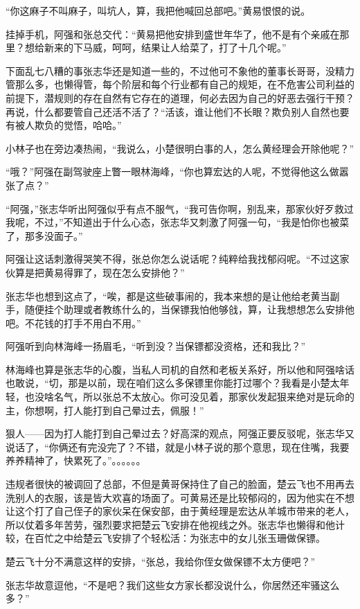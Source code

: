 “你这麻子不叫麻子，叫坑人，算，我把他喊回总部吧。”黄易恨恨的说。

挂掉手机，阿强和张总交代：“黄易把他安排到盛世年华了，他不是有个亲戚在那里？想给新来的下马威，呵呵，结果让人给菜了，打了十几个呢。”

下面乱七八糟的事张志华还是知道一些的，不过他可不象他的董事长哥哥，没精力管那么多，也懒得管，每个阶层和每个行业都有自己的规矩，在不危害公司利益的前提下，潜规则的存在自然有它存在的道理，何必去因为自己的好恶去强行干预？再说，什么都要管自己还活不活了？“活该，谁让他们不长眼？欺负别人自然也要有被人欺负的觉悟，哈哈。”

小林子也在旁边凑热闹，“我说么，小楚很明白事的人，怎么黄经理会开除他呢？”

“哦？”阿强在副驾驶座上瞥一眼林海峰，“你也算宏达的人呢，不觉得他这么做嚣张了点？”

“阿强，”张志华听出阿强似乎有点不服气，“我可告你啊，别乱来，那家伙好歹救过我呢，不过，”不知道出于什么心态，张志华又刺激了阿强一句，“我是怕你也被菜了，那多没面子。”

阿强让这话刺激得哭笑不得，张总你怎么说话呢？纯粹给我找郁闷呢。“不过这家伙算是把黄易得罪了，现在怎么安排他？”

张志华也想到这点了，“唉，都是这些破事闹的，我本来想的是让他给老黄当副手，随便挂个助理或者教练什么的，当保镖我怕他够戗，算，让我想想怎么安排他吧。不花钱的打手不用白不用。”

阿强听到向林海峰一扬眉毛，“听到没？当保镖都没资格，还和我比？”

林海峰也算是张志华的心腹，当私人司机的自然和老板关系好，所以他和阿强啥话也敢说，“切，那是以前，现在咱们这么多保镖里你能打过哪个？我看是小楚太年轻，也没啥名气，所以张总不太放心。你可没见着，那家伙发起狠来绝对是玩命的主，你想啊，打人能打到自己晕过去，佩服！”

狠人——因为打人能打到自己晕过去？好高深的观点，阿强正要反驳呢，张志华又说话了，“你俩还有完没完了？不错，就是小林子说的那个意思，现在住嘴，我要养养精神了，快累死了。”。。。。。。

违规者很快的被调回了总部，不但是黄哥保持住了自己的脸面，楚云飞也不用再去洗别人的衣服，该是皆大欢喜的场面了。可黄易还是比较郁闷的，因为他实在不想让这个打了自己侄子的家伙呆在保安部，由于黄经理是宏达从羊城市带来的老人，所以仗着多年苦劳，强烈要求把楚云飞安排在他视线之外。张志华也懒得和他计较，在百忙之中给楚云飞安排了个轻松活：为张志中的女儿张玉珊做保镖。

楚云飞十分不满意这样的安排，“张总，我给你侄女做保镖不太方便吧？”

张志华故意逗他，“不是吧？我们这些女方家长都没说什么，你居然还牢骚这么多？”

